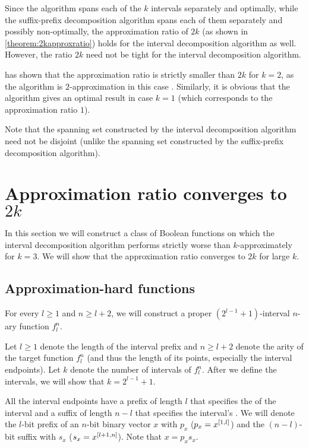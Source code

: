 Since the algorithm
spans each of the $k$ intervals separately and optimally,
while the suffix-prefix decomposition algorithm
spans each of them separately and possibly non-optimally,
the approximation ratio of $2k$
(as shown in \autoref{theorem:2kapproxratio})
holds for the interval decomposition algorithm as well.
However,
the ratio $2k$ need not be tight
for the interval decomposition algorithm.

\citeauthor{Dubovsky2012} has shown
that the approximation ratio is strictly smaller than $2k$
for $k = 2$,
as the algorithm is $2$-approximation
in this case \citep[p.~39]{Dubovsky2012}. %
Similarly,
it is obvious that the algorithm
gives an optimal result in case $k = 1$
(which corresponds to the approximation ratio $1$).

Note that the spanning set constructed
by the interval decomposition algorithm
need not be disjoint
(unlike the spanning set constructed
by the suffix-prefix decomposition algorithm).

\section{Approximation ratio converges
to \texorpdfstring{$2k$}{2k}}

In this section
we will construct a class of Boolean functions
on which the interval decomposition algorithm
performs strictly worse than $k$-approximately
for $k = 3$.
We will show that the approximation ratio converges to $2k$
for large $k$.

\subsection{Approximation-hard functions}

For every $l \geq 1$ and $n \geq l+2$,
we will construct
a proper $(2^{l-1} + 1)$-interval $n$-ary function $f_l^n$.

Let $l \geq 1$
denote the length of the interval  prefix
and $n \geq l+2$
denote the arity of the target function $f_l^n$
(and thus the length of its points,
especially the interval endpoints).
Let $k$ denote the number of intervals of $f_l^n$.
After we define the intervals,
we will show that $k = 2^{l-1} + 1$.

All the interval endpoints have a prefix of length $l$
that specifies the  of the interval
and a suffix of length $n - l$
that specifies the interval's .
We will denote the $l$-bit  prefix
of an $n$-bit binary vector $x$ with $p_x$
($p_x = x^{[1, l]}$)
and the $(n-l)$-bit  suffix with $s_x$
($s_x = x^{[l+1, n]}$).
Note that $x = p_x s_x$.

